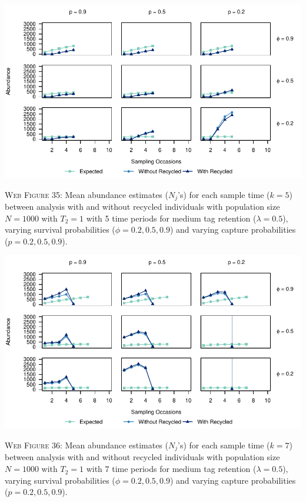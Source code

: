 \documentclass[]{article}
\begin{document}
\includegraphics{Appendix_files/figure-latex/35_abundance_M_GJSTL5-1.pdf}

\textsc{Web Figure 35:} Mean abundance estimates (\(N_j\)'s) for each
sample time (\(k=5\)) between analysis with and without recycled
individuals with population size \(N=1000\) with \(T_2=1\) with 5 time
periods for medium tag retention (\(\lambda=0.5\)), varying survival
probabilities (\(\phi=0.2,0.5,0.9\)) and varying capture probabilities
(\(p=0.2,0.5,0.9\)).

\includegraphics{Appendix_files/figure-latex/36_abundance_M_GJSTL6-1.pdf}

\textsc{Web Figure 36:} Mean abundance estimates (\(N_j\)'s) for each
sample time (\(k=7\)) between analysis with and without recycled
individuals with population size \(N=1000\) with \(T_2=1\) with 7 time
periods for medium tag retention (\(\lambda=0.5\)), varying survival
probabilities (\(\phi=0.2,0.5,0.9\)) and varying capture probabilities
(\(p=0.2,0.5,0.9\)).

\newpage
\end{document}
